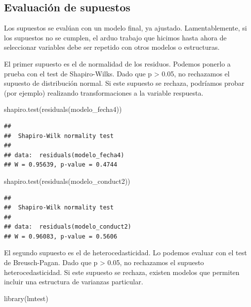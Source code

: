 \documentclass[
]{book}
\newenvironment{Shaded}{\begin{snugshade}}{\end{snugshade}}
\newcommand{\FunctionTok}[1]{\textcolor[rgb]{0.00,0.00,0.00}{#1}}
\newcommand{\NormalTok}[1]{#1}
\begin{document}
\hypertarget{evaluaciuxf3n-de-supuestos}{%
\subsection{Evaluación de supuestos}\label{evaluaciuxf3n-de-supuestos}}

Los supuestos se evalúan con un modelo final, ya ajustado. Lamentablemente, si los supuestos no se cumplen, el arduo trabajo que hicimos hasta ahora de seleccionar variables debe ser repetido con otros modelos o estructuras.

El primer supuesto es el de normalidad de los residuos. Podemos ponerlo a prueba con el test de Shapiro-Wilks. Dado que p \textgreater{} 0.05, no rechazamos el supuesto de distribución normal. Si este supuesto se rechaza, podríamos probar (por ejemplo) realizando transformaciones a la variable respuesta.

\begin{Shaded}
\begin{Highlighting}[]
\FunctionTok{shapiro.test}\NormalTok{(}\FunctionTok{residuals}\NormalTok{(modelo\_fecha4))}
\end{Highlighting}
\end{Shaded}

\begin{verbatim}
## 
##  Shapiro-Wilk normality test
## 
## data:  residuals(modelo_fecha4)
## W = 0.95639, p-value = 0.4744
\end{verbatim}

\begin{Shaded}
\begin{Highlighting}[]
\FunctionTok{shapiro.test}\NormalTok{(}\FunctionTok{residuals}\NormalTok{(modelo\_conduct2))}
\end{Highlighting}
\end{Shaded}

\begin{verbatim}
## 
##  Shapiro-Wilk normality test
## 
## data:  residuals(modelo_conduct2)
## W = 0.96083, p-value = 0.5606
\end{verbatim}

El segundo supuesto es el de heterocedasticidad. Lo podemos evaluar con el test de Breusch-Pagan. Dado que p \textgreater{} 0.05, no rechazamos el supuesto heterocedasticidad. Si este supuesto se rechaza, existen modelos que permiten incluir una estructura de varianzas particular.

\begin{Shaded}
\begin{Highlighting}[]
\FunctionTok{library}\NormalTok{(lmtest)}
\end{Highlighting}
\end{Shaded}
\end{document}
